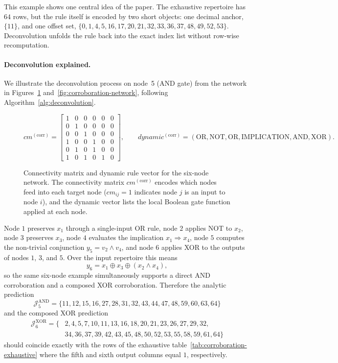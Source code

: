 \documentclass[11pt]{article}
\theoremstyle{definition}
\newcommand{\J}{\mathcal{J}}
\begin{document}
This example shows one central idea of the paper. The exhaustive repertoire has \(64\) rows, but the rule itself is encoded by two short objects: one decimal anchor, \(\{11\}\), and one offset set, \(\{0,1,4,5,16,17,20,21,32,33,36,37,48,49,52,53\}\). Deconvolution unfolds the rule back into the exact index list without row-wise recomputation.

\paragraph{Deconvolution explained.}
We illustrate the deconvolution process on node~5 (AND gate) from the network in
Figures~\ref{fig:corroboration-matrices} and~\ref{fig:corroboration-network},
following Algorithm~\ref{alg:deconvolution}.


\begin{figure}[t]
\centering
\small
\[
cm^{(\mathrm{corr})}=
\begin{bmatrix}
1&0&0&0&0&0\\
0&1&0&0&0&0\\
0&0&1&0&0&0\\
1&0&0&1&0&0\\
0&1&0&1&0&0\\
1&0&1&0&1&0
\end{bmatrix},
\qquad
dynamic^{(\mathrm{corr})}=
(\mathrm{OR},\mathrm{NOT},\mathrm{OR},\mathrm{IMPLICATION},\mathrm{AND},\mathrm{XOR}).
\]
\caption{Connectivity matrix and dynamic rule vector for the six-node network. 
The connectivity matrix \(cm^{(\mathrm{corr})}\) encodes which nodes feed into each target 
node (\(cm_{ij}=1\) indicates node \(j\) is an input to node \(i\)), and the 
dynamic vector lists the local Boolean gate function applied at each node.}
\label{fig:corroboration-matrices}
\end{figure}


Node \(1\) preserves \(x_1\) through a single-input OR rule, node \(2\) applies NOT to \(x_2\), node \(3\) preserves \(x_3\), node \(4\) evaluates the implication \(x_1\Rightarrow x_4\), node \(5\) computes the non-trivial conjunction \(y_5=v_2\land v_4\), and node \(6\) applies XOR to the outputs of nodes \(1\), \(3\), and \(5\). Over the input repertoire this means
\[
y_6=x_1\oplus x_3\oplus (x_2\land x_4),
\]
so the same six-node example simultaneously supports a direct AND corroboration and a composed XOR corroboration. Therefore the analytic prediction
\[
\J_5^{\mathrm{AND}}=\{11,12,15,16,27,28,31,32,43,44,47,48,59,60,63,64\}
\]
and the composed XOR prediction
\[
\begin{aligned}
\J_6^{\mathrm{XOR}}=\{&2,4,5,7,10,11,13,16,18,20,21,23,26,27,29,32,\\
&34,36,37,39,42,43,45,48,50,52,53,55,58,59,61,64\}
\end{aligned}
\]
should coincide exactly with the rows of the exhaustive table~\ref{tab:corroboration-exhaustive} where the fifth and sixth output columns equal \(1\), respectively.
\end{document}

